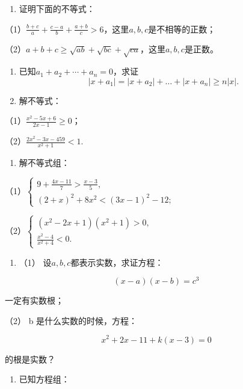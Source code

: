 \begin{enumerate}[start=2]
\item
  证明下面的不等式：
\end{enumerate}

（1）\(\frac{b + c}{a} + \frac{c - a}{b} + \frac{a + b}{c} > 6\)，这里\(a, b, c\)是不相等的正数；

（2）\(a + b + c \geqslant \sqrt{ab} + \sqrt{bc} + \sqrt{ca}\)，这里\(a, b, c\)是正数。

\begin{enumerate}[start=3]
\item
  已知\(a_1 + a_2 + \cdots + a_n = 0\)，求证
\[
\left| x + a_{1} \right| = \left| x + a_{2} \right| + \dots + \left| x + a_{n} \right| \geqslant n | x |.
\]
\item
  解不等式：
\end{enumerate}

（1）\(\frac{x^2 - 5x + 6}{2x - 1} \geqslant 0\)；

（2）\(\frac{2x^2 - 3x - 459}{x^2 + 1} < 1.\)

\begin{enumerate}[start=5]
\item
  解不等式组：
\end{enumerate}

（1）\(\left\{ \begin{array}{l} 9 + \frac{4x - 11}{7} > \frac{x - 3}{5}, \\ (2 + x)^2 + 8x^2 < (3x - 1)^2 - 12; \end{array} \right.\)

（2）\(\left\{ \begin{array}{l} (x^2 - 2x + 1)(x^2 + 1) > 0, \\ \frac{x^2 - 4}{x^2 + 4} < 0. \end{array} \right.\)

\begin{enumerate}[start=6]
\item
  （1） 设\(a, b, c\)都表示实数，求证方程：
\end{enumerate}

\[
(x - a) (x - b) = c^{3}
\]

一定有实数根；

（2） b 是什么实数的时候，方程：

\[
x^{2} + 2 x - 11 + k (x - 3) = 0
\]

的根是实数？

\begin{enumerate}[start=7]
\item
  已知方程组：
\end{enumerate}


